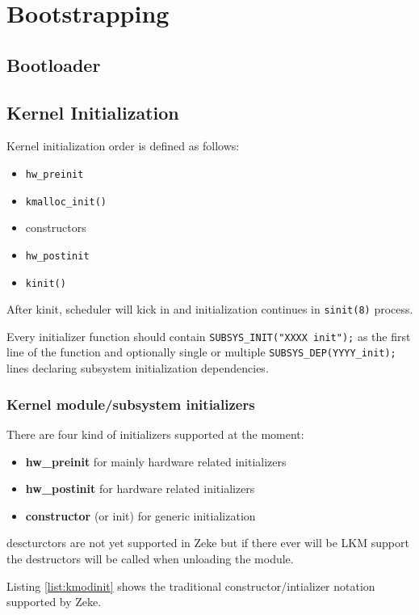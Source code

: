 \part{Bootstrapping}
\chapter{Bootloader}
\chapter{Kernel Initialization}

Kernel initialization order is defined as follows:
\begin{itemize}
    \item \verb+hw_preinit+
    \item \verb+kmalloc_init()+
    \item constructors
    \item \verb+hw_postinit+
    \item \verb+kinit()+
\end{itemize}

After kinit, scheduler will kick in and initialization continues in
\verb+sinit(8)+ process.

Every initializer function should contain \verb+SUBSYS_INIT("XXXX init");+ as
the first line of the function and optionally single or multiple
\verb+SUBSYS_DEP(YYYY_init);+ lines declaring subsystem initialization
dependencies.

\section{Kernel module/subsystem initializers}

There are four kind of initializers supported at the moment:

\begin{itemize}
    \item \textbf{hw\_preinit} for mainly hardware related initializers
    \item \textbf{hw\_postinit} for hardware related initializers
    \item \textbf{constructor} (or init) for generic initialization
\end{itemize}

descturctors are not yet supported in Zeke but if there ever will be LKM
support the destructors will be called when unloading the module.

Listing \ref{list:kmodinit} shows the traditional constructor/intializer
notation supported by Zeke.  

